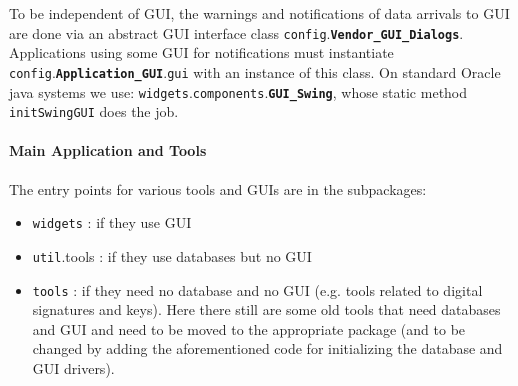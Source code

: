 \documentclass{book}
\newcommand{\pkg}[1]{{\tt #1}}
\newcommand{\cls}[1]{{\tt\bf #1}}
\newcommand{\mth}[1]{{\tt #1}}
\newcommand{\mmb}[1]{{\tt #1}}
\begin{document}
To be independent of GUI, the warnings and notifications of data arrivals to GUI are done via an abstract GUI interface class
\pkg{config}.\cls{Vendor\_GUI\_Dialogs}. Applications using some GUI for notifications must instantiate
\pkg{config}.\cls{Application\_GUI}.\mmb{gui} with an instance of this class.  On standard Oracle java systems we use: 
\pkg{widgets}.\pkg{components}.\cls{GUI\_Swing}, whose static method \mth{initSwingGUI} does the job.

\paragraph{Main Application and Tools}
The entry points for various tools and GUIs are in the subpackages:
\begin{itemize}
\item
 \pkg{widgets} : if they use GUI
\item
 \pkg{util}.{tools} : if they use databases but no GUI
\item
 \pkg{tools} : if they need no database and no GUI (e.g. tools related to digital signatures and keys). Here there still are some old tools
 that need databases and GUI and need to be moved to the appropriate package (and to be changed by adding the aforementioned code for initializing the database and GUI drivers).
\end{itemize}
\end{document}
